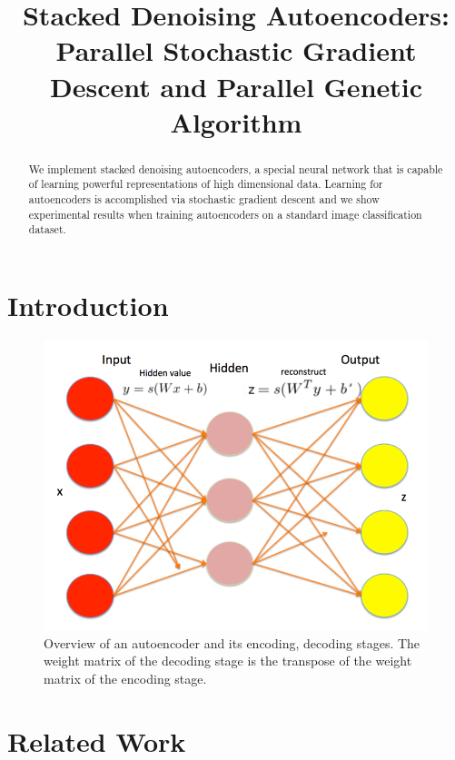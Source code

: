\documentclass[conference,onecolumn]{IEEEtran}
\begin{document}
\title{Stacked Denoising Autoencoders: Parallel Stochastic Gradient Descent and Parallel Genetic Algorithm}

\author{
\and
{}
}

\maketitle

\begin{abstract}
We implement stacked denoising autoencoders, a special neural network that is capable of learning powerful representations of high dimensional data. Learning for autoencoders is accomplished via stochastic gradient descent and we show experimental results when training autoencoders on a standard image classification dataset. 
\end{abstract}

\FloatBarrier
\section{Introduction}

\begin{figure}[h]
\centering
\includegraphics[width=0.8\linewidth]{autoencoder.png}
\caption{Overview of an autoencoder and its encoding, decoding stages. The weight matrix of the decoding stage is the transpose of the weight matrix of the encoding stage.}
\label{fig:autoencoder}
\end{figure}
\FloatBarrier
\section{Related Work}


\FloatBarrier
\end{document}

